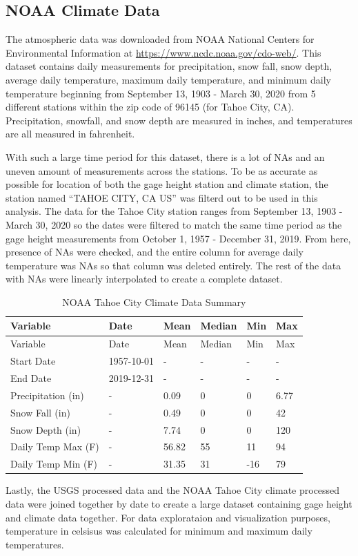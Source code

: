 \documentclass[12pt,]{article}
\begin{document}
\hypertarget{noaa-climate-data}{%
\subsection{NOAA Climate Data}\label{noaa-climate-data}}

The atmospheric data was downloaded from NOAA National Centers for
Environmental Information at \url{https://www.ncdc.noaa.gov/cdo-web/}.
This dataset contains daily measurements for precipitation, snow fall,
snow depth, average daily temperature, maximum daily temperature, and
minimum daily temperature beginning from September 13, 1903 - March 30,
2020 from 5 different stations within the zip code of 96145 (for Tahoe
City, CA). Precipitation, snowfall, and snow depth are measured in
inches, and temperatures are all measured in fahrenheit.

With such a large time period for this dataset, there is a lot of NAs
and an uneven amount of measurements across the stations. To be as
accurate as possible for location of both the gage height station and
climate station, the station named ``TAHOE CITY, CA US'' was filterd out
to be used in this analysis. The data for the Tahoe City station ranges
from September 13, 1903 - March 30, 2020 so the dates were filtered to
match the same time period as the gage height measurements from October
1, 1957 - December 31, 2019. From here, presence of NAs were checked,
and the entire column for average daily temperature was NAs so that
column was deleted entirely. The rest of the data with NAs were linearly
interpolated to create a complete dataset.

\begin{longtable}[]{@{}llllll@{}}
\caption{\label{tab:table} NOAA Tahoe City Climate Data
Summary}\tabularnewline
\toprule
Variable & Date & Mean & Median & Min & Max\tabularnewline
\midrule
\endfirsthead
\toprule
Variable & Date & Mean & Median & Min & Max\tabularnewline
\midrule
\endhead
Start Date & 1957-10-01 & - & - & - & -\tabularnewline
End Date & 2019-12-31 & - & - & - & -\tabularnewline
Precipitation (in) & - & 0.09 & 0 & 0 & 6.77\tabularnewline
Snow Fall (in) & - & 0.49 & 0 & 0 & 42\tabularnewline
Snow Depth (in) & - & 7.74 & 0 & 0 & 120\tabularnewline
Daily Temp Max (F) & - & 56.82 & 55 & 11 & 94\tabularnewline
Daily Temp Min (F) & - & 31.35 & 31 & -16 & 79\tabularnewline
\bottomrule
\end{longtable}

Lastly, the USGS processed data and the NOAA Tahoe City climate
processed data were joined together by date to create a large dataset
containing gage height and climate data together. For data explorataion
and visualization purposes, temperature in celsisus was calculated for
minimum and maximum daily temperatures.
\end{document}
